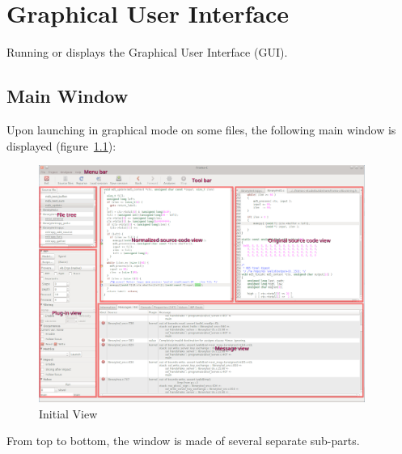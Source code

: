 \chapter{Graphical User Interface}
\label{user-gui}

Running  or  displays the
\FramaC Graphical User Interface (GUI).

\section{\FramaC Main Window}

Upon launching \FramaC in graphical mode on some \C files, the following main
window is displayed (figure~\ref{fig:gui-init}):
\begin{figure}[htbp]
\begin{center}
\includegraphics[width=0.95\textwidth]{gui-main-window.png}
\end{center}
\caption{Initial View}
\label{fig:gui-init}
\end{figure}

From top to bottom, the window is made of several separate sub-parts.

